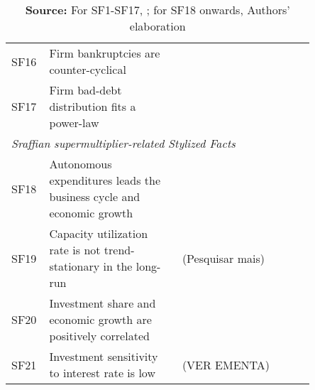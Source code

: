 \begin{table*}[htb]
{\begin{tabular}{p{0.05\linewidth}p{0.4\linewidth}p{0.4\linewidth}}
SF16                               & Firm bankruptcies are counter-cyclical                               & \textcites{jaimovich2008a}                                                                                             \\
SF17                               & Firm bad-debt distribution fits a power-law                          & \textcites{diguilmi2004a}                                                                                              \\
\multicolumn{3}{l}{\textit{Sraffian supermultiplier-related Stylized Facts}}                                                                                                                                                       \\
SF18                               & Autonomous expenditures leads the business cycle and economic growth & \textcites{Haluska2020,Braga2020,PerezMontiel_2020,Girardi_2020,Fiebiger_2017,green_follow_1997,leamer_housing_2007,leamer_housing_2015,PerezMontiel_2021} \\
SF19                               & Capacity utilization rate is not trend-stationary in the long-run    & \textcites{Gahn_2020} (Pesquisar mais)                                                                                                  \\
SF20                               & Investment share and economic growth are positively correlated       & \textcites{Braga2020,Haluska2020,Girardi_2020,chirinko1993a,Long_1991}                                                                            \\
SF21                               & Investment sensitivity to interest rate is low                       & \textcite{chirinko1993a,Sharpe_2021,Long_1991}(VER EMENTA)                                                                                 \\
\hline\hline
\end{tabular}%
}
\caption*{\textbf{Source:} For SF1-SF17, \textcite[p.~1501]{dosi_2020_RATIONAL}; for SF18 onwards, Authors' elaboration}
\end{table*}
